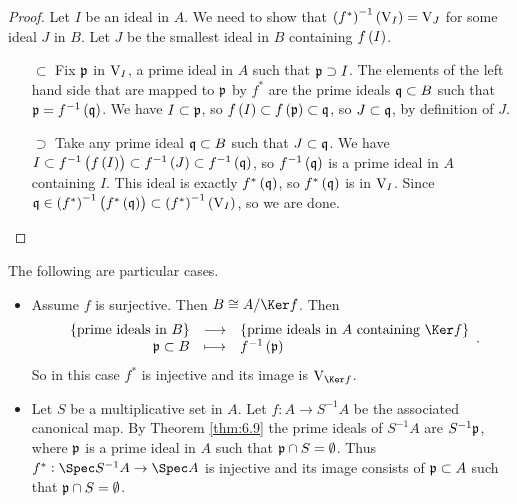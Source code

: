 \begin{proof}
Let $ I $ be an ideal in $ A $. We need to show that $ \br{f^*}^{-1}\br{\V_I} = \V_J $ for some ideal $ J $ in $ B $. Let $ J $ be the smallest ideal in $ B $ containing $ f\br{I} $.
\begin{itemize}
\item[$ \subset $] Fix $ \mathfrak{p} $ in $ \mathrm{V}_I $, a prime ideal in $ A $ such that $ \mathfrak{p} \supset I $. The elements of the left hand side that are mapped to $ \mathfrak{p} $ by $ f^* $ are the prime ideals $ \mathfrak{q} \subset B $ such that $ \ppp = f^{-1}\br{\qqq} $. We have $ I \subset \mathfrak{p} $, so $ f\br{I} \subset f\br{\ppp} \subset \qqq $, so $ J \subset \mathfrak{q} $, by definition of $ J $.
\item[$ \supset $] Take any prime ideal $ \mathfrak{q} \subset B $ such that $ J \subset \mathfrak{q} $. We have $ I \subset f^{-1}\br{f\br{I}} \subset f^{-1}\br{J} \subset f^{-1}\br{\qqq} $, so $ f^{-1}\br{\qqq} $ is a prime ideal in $ A $ containing $ I $. This ideal is exactly $ f^*\br{\qqq} $, so $ f^*\br{\qqq} $ is in $ \mathrm{V}_I $. Since $ \qqq \in \br{f^*}^{-1}\br{f^*\br{\qqq}} \subset \br{f^*}^{-1}\br{\V_I} $, so we are done.
\end{itemize}
\end{proof}

\pagebreak


The following are particular cases.
\begin{itemize}
\item Assume $ f $ is surjective. Then $ B \cong A / \Ker f $. Then
$$ \function{\cbr{\text{prime ideals in} \ B}}{\cbr{\text{prime ideals in} \ A \ \text{containing} \ \Ker f}}{\ppp \subset B}{f^{-1}\br{\ppp}}. $$
So in this case $ f^* $ is injective and its image is $ \V_{\Ker f} $.
\item Let $ S $ be a multiplicative set in $ A $. Let $ f : A \to S^{-1}A $ be the associated canonical map. By Theorem \ref{thm:6.9} the prime ideals of $ S^{-1}A $ are $ S^{-1}\mathfrak{p} $, where $ \mathfrak{p} $ is a prime ideal in $ A $ such that $ \mathfrak{p} \cap S = \emptyset $. Thus $ f^* : \Spec S^{-1}A \to \Spec A $ is injective and its image consists of $ \mathfrak{p} \subset A $ such that $ \mathfrak{p} \cap S = \emptyset $.
\end{itemize}

